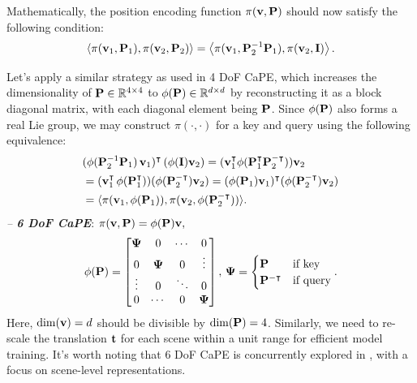 \documentclass[10pt,twocolumn,letterpaper]{article}
\begin{document}
Mathematically, the position encoding function $\pi ({\bf v},{\bf P})$ should now satisfy the following condition:
{\footnotesize 
\begin{align}
    \left\langle \pi({\bf v}_1, {\bf P}_1), \pi({\bf v}_2, {\bf P}_2) \right\rangle 
    = \left\langle \pi({\bf v}_1,{\bf P}_2^{-1}{\bf P}_1), \pi({\bf v}_2, {\bf I}) \right\rangle. \label{eq:condition3}
\end{align}
}





Let's apply a similar strategy as used in 4 DoF CaPE, which increases the dimensionality of ${\bf P}\in\mathbb{R}^{4\times 4}$ to $\phi({\bf P})\in\mathbb{R}^{d\times d}$ by reconstructing it as a block diagonal matrix, with each diagonal element being ${\bf P}$. Since $\phi({\bf P})$ also forms a real Lie group, we may construct $\pi(\cdot,\cdot)$ for a key and query using the following equivalence:
{\footnotesize
\begin{align}
&(\phi({\bf P}_2^{-1}{\bf P}_1)\,{\bf v}_1)^\intercal \left(\phi({\bf I}){\bf v}_2\right)= ({\bf v}_1^\intercal \phi({\bf P}_1^\intercal{\bf P}_2^{-\intercal})){\bf v}_2 \\
 &= ({\bf v}_1^\intercal\, \phi({\bf P}_1^\intercal))(\phi({\bf P}_2^{-\intercal}){\bf v}_2) =(\phi({\bf P}_1){\bf v}_1)^\intercal(\phi({\bf P}_2^{-\intercal}){\bf v}_2) \\
 &= \langle \pi({\bf v}_1, \phi({\bf P}_1)), \pi({\bf v}_2, \phi({\bf P}_2^{-\intercal})) \rangle.
\end{align}
}
{\it -- \textbf{6 DoF CaPE}}: $\pi ({\bf v},{\bf P})= {\bf \phi(P)}{\bf v},$
{
\footnotesize
\begin{align}
\setlength\arraycolsep{4pt}
{\bf \phi(P)} = 
\begin{bmatrix}
 {\bf \Psi} & 0 & \cdots & 0 \\
 0 & {\bf \Psi} & 0 & \vdots \\
 \vdots & 0 & \ddots & 0  \\
0 & \cdots & 0 &  {\bf \Psi} 
\end{bmatrix},\, 
{\bf \Psi}=
\begin{cases}
{\bf P}&\text{if key}\\
{\bf P}^{-\intercal} &\text{if query}
\end{cases}.\label{eq:6dof}
\end{align}
}
Here, $\dim({\bf v})=d$ should be divisible by $\dim({\bf P})=4$.
Similarly, we need to re-scale the translation ${\bf t}$ for each scene within a unit range for efficient model training. It's worth noting that 6 DoF CaPE is concurrently explored in \cite{Miyato2024GTA}, with a focus on scene-level representations.
\end{document}
